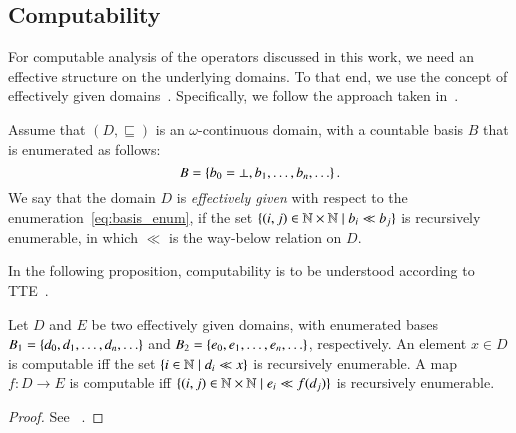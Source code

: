 \documentclass[11pt,times]{article}
\begin{document}
\subsection{Computability}
\label{subsec:computability}




For computable analysis of the operators discussed in this work, we
need an effective structure on the underlying domains. To that end, we
use the concept of effectively given
domains~\parencite{Smyth:effectively_given_domains:1977}. Specifically, we follow the approach
taken
in~\parencite[Section~3]{Edalat-Sunderhauf-dt-computability-on-reals99}.

Assume that $(D, \sqsubseteq)$ is an $\omega$-continuous domain, with
a countable basis $B$ that is enumerated as follows:
    \begin{equation}
      \label{eq:basis_enum}
      B = \left\{{ b_0 = \bot, b_1, \ldots, b_n, \ldots}\right\}.
    \end{equation}
    We say that the domain $D$ is \emph{effectively given} with
    respect to the enumeration~\eqref{eq:basis_enum}, if the set
    $\{{(i,j) \in \mathbb{N} \times \mathbb{N}} \mid { b_i \ll b_j}\}$ is
    recursively enumerable, in which $\ll$ is the way-below relation
    on $D$.

    In the following proposition, computability is to be understood
    according to \acl{TTE}~\parencite{Weihrauch2000:book}.


    
    \begin{proposition}
    \label{prop:comp_elem_fun}
    Let $D$ and $E$ be two effectively given domains, with enumerated
    bases $B_1 = \left\{{d_0, d_1, \ldots, d_n, \ldots}\right\}$ and
    $B_2 = \left\{{e_0, e_1, \ldots, e_n, \ldots}\right\}$, respectively. An
    element $x \in D$ is computable iff the set
    $\{{i \in \mathbb{N}} \mid {d_i \ll x}\}$ is recursively enumerable. A
    map $f: D \to E$ is computable iff
    $\{{(i,j) \in \mathbb{N} \times \mathbb{N}} \mid { e_i \ll f(d_j)}\}$ is
    recursively enumerable.
  \end{proposition}

  \begin{proof}
    See ~\parencite[Proposition~3 and Theorem~9]{Edalat-Sunderhauf-dt-computability-on-reals99}.
  \end{proof}
\end{document}
